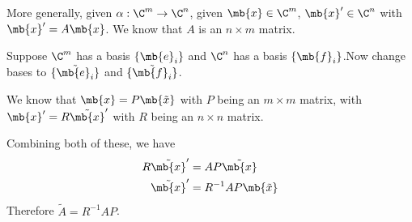 \documentclass[a4paper]{article}
\begin{document}
More generally, given $\alpha: \C^m \to \C^n$, given $\mb{x}\in \C^m$, $\mb{x}'\in \C^n$ with $\mb{x}' = A\mb{x}$. We know that $A$ is an $n\times m$ matrix.

Suppose $\C^m$ has a basis $\{\mb{e}_i\}$ and $\C^n$ has a basis $\{\mb{f}_i\}$.Now change bases to $\{\tilde{\mb{e}_i}\}$ and $\{\tilde{\mb{f}_i}\}$.

We know that $\mb{x} = P\mb{\tilde{x}}$ with $P$ being an $m\times m$ matrix, with $\mb{x}' = R\tilde{\mb{x}}'$ with $R$ being an $n\times n$ matrix.

Combining both of these, we have
\begin{align*}
  R\tilde{\mb{x}}' &= AP\tilde{\mb{x}}\\
  \tilde{\mb{x}}' &= R^{-1}AP\mb{\tilde{x}}
\end{align*}
Therefore $\tilde{A} = R^{-1}AP$.
\end{document}
